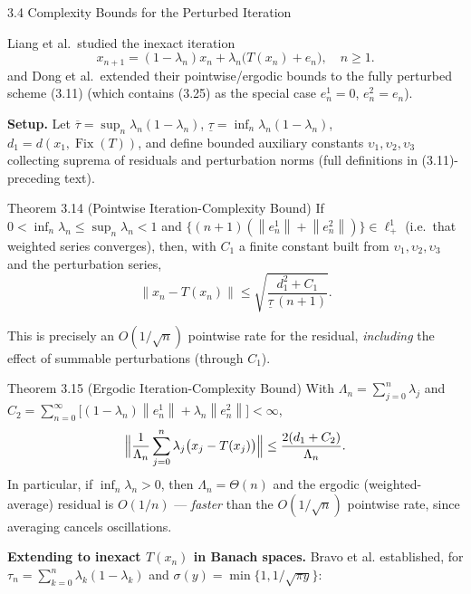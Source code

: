 \documentclass[aspectratio=169,10pt]{beamer}
\newcommand{\Fix}{\operatorname{Fix}}
\newcommand{\norm}[1]{\left\|#1\right\|}
\begin{document}
\begin{frame}[allowframebreaks]{3.4 Complexity Bounds for the Perturbed Iteration}

  Liang et al.\ studied the inexact iteration
  \begin{equation*}
  x_{n+1}=(1-\lambda_n)x_n+\lambda_n\bigl(T(x_n)+e_n\bigr), \quad n\ge1. \tag{3.25}
  \end{equation*}
  and Dong et al.\ extended their pointwise/ergodic bounds to the fully
  perturbed scheme (3.11) (which contains (3.25) as the special case
  $e_n^1=0$, $e_n^2=e_n$).

  \textbf{Setup.} Let
  $\overline\tau=\sup_n\lambda_n(1-\lambda_n)$,
  $\underline\tau=\inf_n\lambda_n(1-\lambda_n)$,
  $d_1=d(x_1,\Fix(T))$, and define bounded auxiliary constants
  $\upsilon_1,\upsilon_2,\upsilon_3$ collecting suprema of residuals and
  perturbation norms (full definitions in (3.11)-preceding text).

  \begin{block}{Theorem 3.14 (Pointwise Iteration-Complexity Bound)}
    If $0<\inf_n\lambda_n\le\sup_n\lambda_n<1$ and
    $\{(n+1)(\norm{e_n^1}+\norm{e_n^2})\}\in\ell^1_+$ (i.e.\ that
    weighted series converges), then, with $C_1$ a finite constant built
    from $\upsilon_1,\upsilon_2,\upsilon_3$ and the perturbation series,
    $$\norm{x_n-T(x_n)}\le\sqrt{\frac{d_1^2+C_1}{\underline\tau\,(n+1)}}.$$
  \end{block}
  This is precisely an $O(1/\sqrt n)$ pointwise rate for the residual,
  \emph{including} the effect of summable perturbations (through $C_1$).

  \framebreak

  \begin{block}{Theorem 3.15 (Ergodic Iteration-Complexity Bound)}
    With $\Lambda_n=\sum_{j=0}^n\lambda_j$ and
    $C_2=\sum_{n=0}^\infty\bigl[(1-\lambda_n)\norm{e_n^1}+\lambda_n\norm{e_n^2}\bigr]<\infty$,
    $$\Bigl\|\frac{1}{\Lambda_n}\sum_{j=0}^n\lambda_j\bigl(x_j-T(x_j)\bigr)\Bigr\|
      \le\frac{2(d_1+C_2)}{\Lambda_n}.$$
    In particular, if $\inf_n\lambda_n>0$, then
    $\Lambda_n=\Theta(n)$ and the ergodic (weighted-average) residual is
    $O(1/n)$ --- \emph{faster} than the $O(1/\sqrt n)$ pointwise rate,
    since averaging cancels oscillations.
  \end{block}

  \framebreak

  \textbf{Extending to inexact $T(x_n)$ in Banach spaces.} Bravo et al.
  established, for $\tau_n=\sum_{k=0}^n\lambda_k(1-\lambda_k)$ and
  $\sigma(y)=\min\{1,1/\sqrt{\pi y}\}$:


\end{frame}
\end{document}

